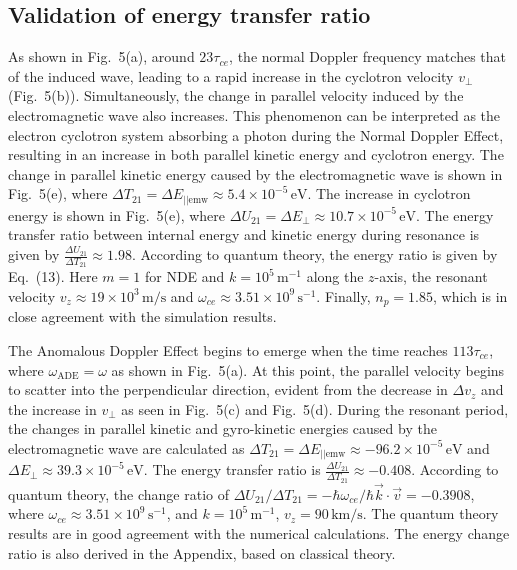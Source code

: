 \documentclass{cpbtex3}
\begin{document}
\subsection{Validation of energy transfer ratio  }

As shown in Fig.~5(a), around \( 23\tau_{ce} \), the normal Doppler frequency matches that of the induced wave, leading to a rapid increase in the cyclotron velocity \( v_{\perp} \) (Fig.~5(b)). Simultaneously, the change in parallel velocity induced by the electromagnetic wave also increases. This phenomenon can be interpreted as the electron cyclotron system absorbing a photon during the Normal Doppler Effect, resulting in an increase in both parallel kinetic energy and cyclotron energy. The change in parallel kinetic energy caused by the electromagnetic wave is shown in Fig.~5(e), where \( \Delta T_{21} = \Delta E_{||\text{emw}} \approx 5.4 \times 10^{-5} \, \text{eV} \). The increase in cyclotron energy is shown in Fig.~5(e), where \( \Delta U_{21} = \Delta E_{\perp} \approx 10.7 \times 10^{-5} \, \text{eV} \). The energy transfer ratio between internal energy and kinetic energy during resonance is given by \( \frac{\Delta U_{21}}{\Delta T_{21}} \approx 1.98 \). According to quantum theory, the energy ratio is given by Eq.~(13). Here \( m = 1 \) for NDE and \( k = 10^5 \, \text{m}^{-1} \) along the \( z \)-axis, the resonant velocity \( v_z \approx 19 \times 10^3 \, \text{m/s} \) and \( \omega_{ce} \approx 3.51 \times 10^9 \, \text{s}^{-1} \). Finally, \( n_p = 1.85 \), which is in close agreement with the simulation results.

The Anomalous Doppler Effect begins to emerge when the time reaches \( 113 \tau_{ce} \), where \( \omega_{\text{ADE}} = \omega \) as shown in Fig.~5(a). At this point, the parallel velocity begins to scatter into the perpendicular direction, evident from the decrease in \( \Delta v_z \) and the increase in \( v_{\perp} \) as seen in Fig.~5(c) and Fig.~5(d). During the resonant period, the changes in parallel kinetic and gyro-kinetic energies caused by the electromagnetic wave are calculated as \( \Delta T_{21} = \Delta E_{||\text{emw}} \approx -96.2 \times 10^{-5} \, \text{eV} \) and \( \Delta E_{\perp} \approx 39.3 \times 10^{-5} \, \text{eV} \). The energy transfer ratio is \( \frac{\Delta U_{21}}{\Delta T_{21}} \approx -0.408 \). According to quantum theory, the change ratio of \( \Delta U_{21}/\Delta T_{21} = -\hbar \omega_{ce}/\hbar \vec{k} \cdot \vec{v} = -0.3908 \), where \( \omega_{ce} \approx 3.51 \times 10^9 \, \text{s}^{-1} \), and \( k = 10^5 \, \text{m}^{-1} \), \( v_z = 90 \, \text{km/s} \). The quantum theory results are in good agreement with the numerical calculations. The energy change ratio is also derived in the Appendix, based on classical theory.
\end{document}
